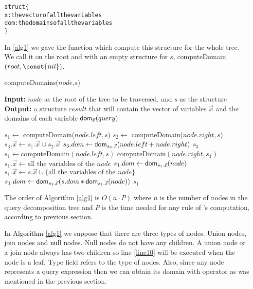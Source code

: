 \documentclass[12pt]{article}
\begin{document}
\begin{alltt}
struct\{
x: the vector of all the variables 
dom: the domains of all the variables
\}
\end{alltt}
In \ref{alg1} we gave the function which compute this structure for the whole tree. We call it on the root and with an empty structure for $s$, computeDomain$(root,\const{nil})$. 
\begin{algorithm}[H]
\caption{computeDomains($node$,$s$)} 
\label{alg1}
\textbf{Input:} $node$ as the root of the tree to be traversed, and $s$ as the structure \\
\textbf{Output:} a structure $result$ that will contain the vector of variables $\vec x$ and the domains of each variable $\textsf{dom}{}_{\vec x}(query)$
\begin{algorithmic}[1]
\STATE  $s_{1}\gets$ computeDomain($node$.$left, s$)
\STATE  $s_{2}\gets$ computeDomain($node.right, s$)
\STATE  $s_{3}.\vec{x}\gets s_{1}.\vec{x} \cup s_{2}.\vec{x}$ 
\STATE  $s_{3}.dom\gets \text{\textsf{dom}}_{s_{3}.\vec x}(node.left + node.right)$
\RETURN  $s_{3}$
\STATE  $s_{1} \gets \text{computeDomain}(node.left, s)$
\RETURN  computeDomain$(node.right, s_{1})$
\ELSE 
\label{line10}
\label{line11}
\STATE $s_{1}.\vec{x} \gets \text{all the variables of the }node$
\STATE $s_{1}.dom \gets \textsf{dom}{}_{s_{1}.\vec{x}}(node)$
\ELSE
\STATE $s_{1}.\vec{x}\gets s.\vec{x} \cup \{\text{all the variables of the $node$}\}$
\STATE $s_{1}.dom\gets \text{\textsf{dom}}_{s_{1}.\vec{x}}(s.dom*\text{\textsf{dom}}_{s_{1}.\vec{x}}(node))$
\ENDIF
\RETURN  $s_{1}$
\ENDIF
\end{algorithmic}
\end{algorithm}
The order of Algorithm \ref{alg1} is $O(n\cdot P)$ where $n$ is the number of nodes in the query decomposition tree and $P$ is the time needed for any rule of \dom{}'s computation, according to previous section.\\ 
\par In Algorithm \ref{alg1} we suppose that there are three types of nodes. Union nodes, join nodes and null nodes. Null nodes do not have any children. A union node or a join node always has two children so line \ref{line10} will be executed when the node is a leaf. Type field refers to the type of nodes. Also, since any node represents a query expression then we can obtain its domain with \dom{} operator as was mentioned in the previous section.\par
\end{document}
